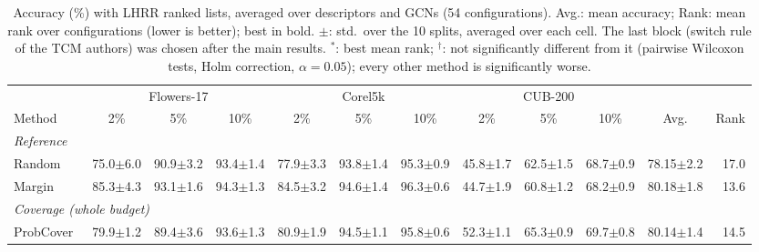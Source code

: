 \begin{table}[t]
\centering
\caption{Accuracy (\%) with LHRR ranked lists, averaged over descriptors and GCNs (54 configurations). Avg.: mean accuracy; Rank: mean rank over configurations (lower is better); best in bold. $\pm$: std.\ over the 10 splits, averaged over each cell. The last block (switch rule of the TCM authors) was chosen after the main results. $^{*}$: best mean rank; $^{\dagger}$: not significantly different from it (pairwise Wilcoxon tests, Holm correction, $\alpha=0.05$); every other method is significantly worse.}
\label{tab:sota-lhrr-std}
\footnotesize
\setlength{\tabcolsep}{3.5pt}
\begin{adjustbox}{max width=\textwidth}
\begin{tabular}{lrrrrrrrrrrr}
\toprule
& \multicolumn{3}{c}{Flowers-17} & \multicolumn{3}{c}{Corel5k} & \multicolumn{3}{c}{CUB-200} & & \\
\cmidrule(lr){2-4}\cmidrule(lr){5-7}\cmidrule(lr){8-10}
Method & \multicolumn{1}{c}{2\%} & \multicolumn{1}{c}{5\%} & \multicolumn{1}{c}{10\%} & \multicolumn{1}{c}{2\%} & \multicolumn{1}{c}{5\%} & \multicolumn{1}{c}{10\%} & \multicolumn{1}{c}{2\%} & \multicolumn{1}{c}{5\%} & \multicolumn{1}{c}{10\%} & \multicolumn{1}{c}{Avg.} & \multicolumn{1}{c}{Rank} \\
\midrule
\multicolumn{12}{l}{\textit{Reference}} \\
\quad Random & 75.0{\scriptsize$\pm$6.0} & 90.9{\scriptsize$\pm$3.2} & 93.4{\scriptsize$\pm$1.4} & 77.9{\scriptsize$\pm$3.3} & 93.8{\scriptsize$\pm$1.4} & 95.3{\scriptsize$\pm$0.9} & 45.8{\scriptsize$\pm$1.7} & 62.5{\scriptsize$\pm$1.5} & 68.7{\scriptsize$\pm$0.9} & 78.15{\scriptsize$\pm$2.2} & 17.0 \\
\quad Margin~\cite{scheffer2001active} & 85.3{\scriptsize$\pm$4.3} & 93.1{\scriptsize$\pm$1.6} & 94.3{\scriptsize$\pm$1.3} & 84.5{\scriptsize$\pm$3.2} & 94.6{\scriptsize$\pm$1.4} & 96.3{\scriptsize$\pm$0.6} & 44.7{\scriptsize$\pm$1.9} & 60.8{\scriptsize$\pm$1.2} & 68.2{\scriptsize$\pm$0.9} & 80.18{\scriptsize$\pm$1.8} & 13.6 \\
\multicolumn{12}{l}{\textit{Coverage (whole budget)}} \\
\quad ProbCover~\cite{yehuda2022active} & 79.9{\scriptsize$\pm$1.2} & 89.4{\scriptsize$\pm$3.6} & 93.6{\scriptsize$\pm$1.3} & 80.9{\scriptsize$\pm$1.9} & 94.5{\scriptsize$\pm$1.1} & 95.8{\scriptsize$\pm$0.6} & 52.3{\scriptsize$\pm$1.1} & 65.3{\scriptsize$\pm$0.9} & 69.7{\scriptsize$\pm$0.8} & 80.14{\scriptsize$\pm$1.4} & 14.5 \\

\end{tabular}
\end{adjustbox}
\end{table}
